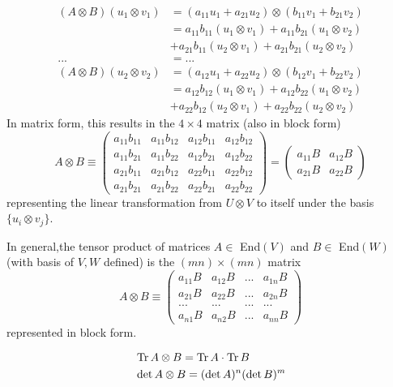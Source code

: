   \begin{align*}
      (A \otimes B) (u_1 \otimes v_1) &= (a_{11} u_1 + a_{21} u_2) \otimes (b_{11} v_1 + b_{21} v_2) \\
      & = a_{11} b_{11} (u_1 \otimes v_1) + a_{11} b_{21} (u_1 \otimes v_2) \\
      & + a_{21} b_{11} (u_2 \otimes v_1) + a_{21} b_{21} (u_2 \otimes v_2) \\
      ... & = ... \\
      (A \otimes B) (u_2 \otimes v_2) & = (a_{12} u_1 + a_{22} u_2) \otimes (b_{12} v_1 + b_{22} v_2) \\
      & = a_{12} b_{12} (u_1 \otimes v_1) + a_{12} b_{22} (u_1 \otimes v_2) \\
      & + a_{22} b_{12} (u_2 \otimes v_1) + a_{22} b_{22} (u_2 \otimes v_2) 
  \end{align*}
  In matrix form, this results in the $4\times 4$ matrix (also in block form)
  \[A \otimes B \equiv \begin{pmatrix}
  a_{11} b_{11} & a_{11} b_{12} & a_{12} b_{11} & a_{12} b_{12} \\
  a_{11} b_{21} & a_{11} b_{22} & a_{12} b_{21} & a_{12} b_{22} \\
  a_{21} b_{11} & a_{21} b_{12} & a_{22} b_{11} & a_{22} b_{12} \\
  a_{21} b_{21} & a_{21} b_{22} & a_{22} b_{21} & a_{22} b_{22} 
  \end{pmatrix} = \begin{pmatrix}
  a_{11} B & a_{12} B \\
  a_{21} B & a_{22} B 
  \end{pmatrix}\]
  representing the linear transformation from $U \otimes V$ to itself under the basis $\{u_i \otimes v_j\}$. 
  \begin{proposition}
  In general,the tensor product of matrices $A \in $ End$(V)$ and $B \in $ End$(W)$ (with basis of $V, W$ defined) is the $(m n) \times (m n)$ matrix
  \[A \otimes B \equiv \begin{pmatrix}
  a_{11} B & a_{12} B & ... & a_{1n} B \\
  a_{21} B & a_{22} B & ... & a_{2n} B \\
  ... & ... & ... & ... \\
  a_{n1} B & a_{n2} B & ... & a_{nn} B 
  \end{pmatrix}\]
  represented in block form. 
  \end{proposition}

  \begin{proposition}
  \begin{align*}
      & \Tr{A \otimes B} = \Tr{A} \cdot \Tr{B} \\
      & \det{A \otimes B} = (\det{A})^n (\det{B})^m
  \end{align*}
  \end{proposition}

